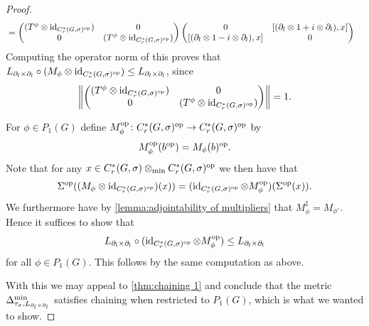 \documentclass[11pt, a4paper, oneside, final, reqno]{amsart}
\newcommand{\id}{\operatorname{id}}
\newcommand{\Cred}{C^*_r}
\theoremstyle{definition}
\theoremstyle{plain}
\theoremstyle{remark}
\numberwithin{equation}{section}
\begin{document}
\begin{proof}
\begin{align*}
        & =
        \begin{pmatrix}
            (T^\phi \otimes \id_{\Cred(G,\sigma)^{\rm op}}) & 0 \\
            0 & (T^\phi \otimes \id_{\Cred(G,\sigma)^{\rm op}})
        \end{pmatrix}
        \begin{pmatrix}
            0 & [(\partial_l \otimes 1 + i \otimes \partial_l), x] \\
            [(\partial_l \otimes 1 - i \otimes \partial_l), x] & 0
        \end{pmatrix}
    \end{align*}
    Computing the operator norm of this proves that $L_{\partial_l \times \partial_l} \circ (M_\phi \otimes \id_{\Cred(G,\sigma)^{\rm op}}) \leq L_{\partial_l \times \partial_l}$, since
    \begin{equation*}
        \left\|
        \begin{pmatrix}
            (T^\phi \otimes \id_{\Cred(G,\sigma)^{\rm op}}) & 0 \\
            0 & (T^\phi \otimes \id_{\Cred(G,\sigma)^{\rm op}})
        \end{pmatrix}
        \right\|
        = 1.
    \end{equation*}

    For $\phi \in P_1(G)$ define $M_\phi^{\rm op} \colon \Cred(G,\sigma)^{\rm op} \to \Cred(G,\sigma)^{\rm op}$ by
    \begin{equation*}
        M_\phi^{\rm op}(b^{\rm op}) = M_\phi(b)^{\rm op}.
    \end{equation*}
    Note that for any $x \in \Cred(G,\sigma) \otimes_{\rm min} \Cred(G,\sigma)^{\rm op}$ we then have that
    \begin{align*}
        \Sigma^{\rm op} ((M_\phi \otimes \id_{\Cred(G,\sigma)^{\rm op}})(x)) = (\id_{\Cred(G,\sigma)^{\rm op}} \otimes M_\phi^{\rm op})(\Sigma^{\rm op}(x)).
    \end{align*}
    We furthermore have by \cref{lemma:adjointability of multipliers} that $M_\phi^\sharp = M_{\phi^\circ}$. Hence it suffices to show that
    \begin{equation*}
        L_{\partial_l \times \partial_l} \circ (\id_{\Cred(G,\sigma)^{\rm op}} \otimes M_\phi^{\rm op}) \leq L_{\partial_l \times \partial_l}
    \end{equation*}
    for all $\phi \in P_1(G)$. This follows by the same computation as above.

    With this we may appeal to \cref{thm:chaining 1} and conclude that the metric $\Delta_{\tau_\sigma,L_{\partial_l \times \partial_l}}^{\rm min}$ satisfies chaining when restricted to $P_{1}(G)$, which is what we wanted to show.
\end{proof}
\end{document}
